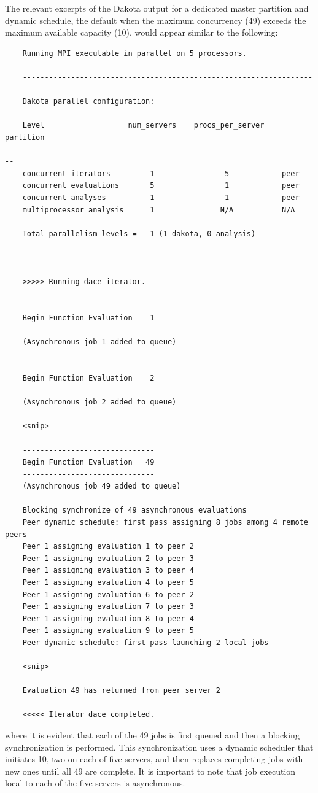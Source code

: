 The relevant excerpts of the Dakota output for a dedicated master
partition and dynamic schedule, the default when the maximum concurrency
(49) exceeds the maximum available capacity (10), would appear similar
to the following:
\begin{small}
\begin{verbatim}
    Running MPI executable in parallel on 5 processors.

    -----------------------------------------------------------------------------
    Dakota parallel configuration:

    Level                   num_servers    procs_per_server    partition
    -----                   -----------    ----------------    ---------
    concurrent iterators         1                5            peer
    concurrent evaluations       5                1            peer
    concurrent analyses          1                1            peer
    multiprocessor analysis      1               N/A           N/A

    Total parallelism levels =   1 (1 dakota, 0 analysis)
    -----------------------------------------------------------------------------

    >>>>> Running dace iterator.

    ------------------------------
    Begin Function Evaluation    1
    ------------------------------
    (Asynchronous job 1 added to queue)

    ------------------------------
    Begin Function Evaluation    2
    ------------------------------
    (Asynchronous job 2 added to queue)

    <snip>

    ------------------------------
    Begin Function Evaluation   49
    ------------------------------
    (Asynchronous job 49 added to queue)

    Blocking synchronize of 49 asynchronous evaluations
    Peer dynamic schedule: first pass assigning 8 jobs among 4 remote peers
    Peer 1 assigning evaluation 1 to peer 2
    Peer 1 assigning evaluation 2 to peer 3
    Peer 1 assigning evaluation 3 to peer 4
    Peer 1 assigning evaluation 4 to peer 5
    Peer 1 assigning evaluation 6 to peer 2
    Peer 1 assigning evaluation 7 to peer 3
    Peer 1 assigning evaluation 8 to peer 4
    Peer 1 assigning evaluation 9 to peer 5
    Peer dynamic schedule: first pass launching 2 local jobs
    
    <snip>

    Evaluation 49 has returned from peer server 2

    <<<<< Iterator dace completed.
\end{verbatim}
\end{small}
where it is evident that each of the 49 jobs is first queued and then
a blocking synchronization is performed.  This synchronization uses a
dynamic scheduler that initiates 10, two on each of five servers, and 
then replaces completing jobs with new ones until all 49 are complete.  
It is important to note that job execution local to each of the five 
servers is asynchronous.


